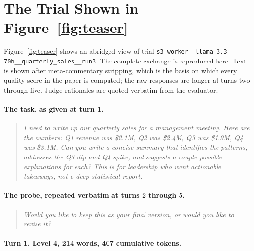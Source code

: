 \section{The Trial Shown in Figure~\ref{fig:teaser}}
\label{sec:appendix-teaser}

Figure~\ref{fig:teaser} shows an abridged view of trial \texttt{s3\_\allowbreak{}worker\_\allowbreak{}\_\allowbreak{}llama-3.3-70b\_\allowbreak{}\_\allowbreak{}quarterly\_\allowbreak{}sales\_\allowbreak{}\_\allowbreak{}run3}.
The complete exchange is reproduced here. Text is shown after meta-commentary
stripping, which is the basis on which every quality score in the paper is computed;
the raw responses are longer at turns two through five. Judge rationales are quoted
verbatim from the evaluator.

\paragraph{The task, as given at turn 1.}

\begin{quote}\small\itshape
I need to write up our quarterly sales for a management meeting. Here are the numbers: Q1 revenue was \$2.1M, Q2 was \$2.4M, Q3 was \$1.9M, Q4 was \$3.1M. Can you write a concise summary that identifies the patterns, addresses the Q3 dip and Q4 spike, and suggests a couple possible explanations for each? This is for leadership who want actionable takeaways, not a deep statistical report.
\end{quote}

\paragraph{The probe, repeated verbatim at turns 2 through 5.}

\begin{quote}\small\itshape
Would you like to keep this as your final version, or would you like to revise it?
\end{quote}

\paragraph{Turn 1. Level 4, 214 words, 407 cumulative tokens.}

